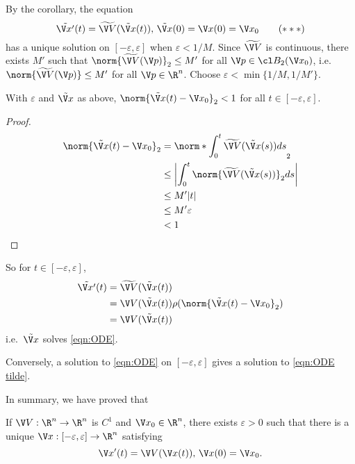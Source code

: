\documentclass[a4paper]{article}
\theoremstyle{definition}
\begin{document}
By the corollary, the equation
\begin{equation*}
  \label{eqn:ODE tilde}
  \tilde{\V x'}(t) = \widetilde{\V V}(\tilde{\V x}(t)), \, \tilde{\V x}(0) = \V x(0) = \V x_0
  \tag{\(\ast\ast\ast\)}
\end{equation*}
has a unique solution on \([-\varepsilon, \varepsilon]\) when \(\varepsilon < 1/M\). Since \(\widetilde{\V V}\) is continuous, there exists \(M'\) such that \(\norm{\widetilde{\V V}(\V p)}_2 \leq M'\) for all \(\V p \in \cl B_2(\V x_0)\), i.e.\ \(\norm{\widetilde{\V V}(\V p)} \leq M'\) for all \(\V p \in \R^n\). Choose \(\varepsilon < \min\{1/M, 1/M'\}\).

\begin{lemma}
  With \(\varepsilon\) and \(\tilde{\V x}\) as above, \(\norm{\tilde{\V x}(t) - \V x_0}_2 < 1\) for all \(t \in [-\varepsilon, \varepsilon]\).
\end{lemma}

\begin{proof}
  \begin{align*}
    \norm{\tilde{\V x}(t) - \V x_0}_2 &= \norm*{\int_0^t \widetilde{\V V}(\tilde{\V x}(s)) ds}_2 \\
                                     &\leq \left| \int_0^t \norm{\widetilde{\V V}(\tilde{\V x}(s))}_2 ds \right| \\
                                     &\leq M'|t| \\
                                     &\leq M'\varepsilon \\
                                     &< 1
  \end{align*}
\end{proof}

So for \(t \in [-\varepsilon, \varepsilon]\),
\begin{align*}
  \tilde{\V x'}(t) &= \widetilde{\V V}(\tilde{\V x}(t)) \\
                  &= \V V(\tilde{\V x}(t)) \rho(\norm{\tilde{\V x}(t) - \V x_0}_2) \\
                  &= \V V(\tilde{\V x}(t))
\end{align*}
i.e.\ \(\tilde{\V x}\) solves \eqref{eqn:ODE}.

Conversely, a solution to \eqref{eqn:ODE} on \([-\varepsilon, \varepsilon]\) gives a solution to \eqref{eqn:ODE tilde}.

In summary, we have proved that

\begin{theorem}
  If \(\V V: \R^n \to \R^n\) is \(C^1\) and \(\V x_0 \in \R^n\), there exists \(\varepsilon > 0\) such that there is a unique \(\V x: [-\varepsilon, \varepsilon] \to \R^n\) satisfying
  \[
    \V x'(t) = \V V(\V x(t)), \, \V x(0) = \V x_0.
  \]
\end{theorem}
\end{document}
